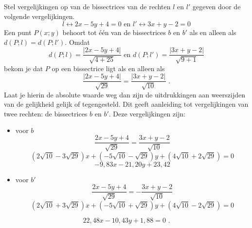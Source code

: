 \begin{voorbeeld}
	Stel vergelijkingen op van de bissectrices van de rechten $l$ en $l'$ gegeven door de volgende vergelijkingen.
\[
l \leftrightarrow 2x-5y+4=0 \text { en } l' \leftrightarrow3x+y-2=0 
\]
Een punt $P(x;y)$ behoort tot \'e\'en van de bissectrices $b$ en $b'$ als en alleen als $d(P;l)=d(P;l')$.
Omdat
\[
d(P;l)=\frac { \vert 2x-5y+4 \vert }{\sqrt {4 + 25}} \text { en } d(P;l')=\frac { \vert 3x+y-2 \vert }{\sqrt {9+1}}
\]
bekom je dat $P$ op een bissectrice ligt als en alleen als
\[
\frac { \vert 2x-5y+4 \vert }{\sqrt {29}}=\frac { \vert 3x+y-2 \vert }{\sqrt {10}} \text { .}
\]
Laat je hierin de absolute waarde weg dan zijn de uitdrukkingen aan weerszijden van de gelijkheid gelijk of tegengesteld.
Dit geeft aanleiding tot vergelijkingen van twee rechten: de bissectrices $b$ en $b'$.
Deze vergelijkingen zijn:
\begin{itemize}
\item  voor $b$
\[
\frac {2x-5y+4}{\sqrt {29}}=\frac {3x+y-2}{\sqrt {10 }}
\]
\[
(2\sqrt {10}-3\sqrt {29})x+(-5\sqrt {10}-\sqrt {29})y+(4\sqrt {10}+2\sqrt {29})=0
\]
\[
-9,83x-21,20y+23,42
\]
\item voor $b'$
\[
\frac {2x-5y+4}{\sqrt {29}}=-\frac {3x+y-2}{\sqrt {10}}
\]
\[
(2\sqrt {10}+3\sqrt {29})x+(-5\sqrt{10}+\sqrt{29})y+(4\sqrt{10}-2\sqrt{29})=0
\]
\end{itemize}
\[
22,48x-10,43y+1,88=0 \text { .}
\]

\end{voorbeeld}